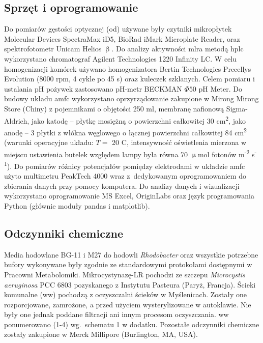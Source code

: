 \subsection{Sprzęt i oprogramowanie}\label{subsec:sprzet}
Do pomiarów gęstości optycznej (\acrshort{od}) używane były czytniki mikropłytek
Molecular Devices SpectraMax iD5, BioRad iMark
Microplate Reader, oraz spektrofotometr Unicam Helios $\upbeta$.
Do analizy aktywności \acrshort{mlra} metodą \acrshort{hplc} wykorzystano chromatograf
Agilent Technologies 1220 Infinity LC\@.
W celu homogenizacji komórek używano homogenizatora
Bertin Technologies Precellys Evolution (8000 rpm, 4 cykle po 45 s)
oraz kuleczek szklanych.
Celem pomiaru i ustalania pH pożywek zastosowano pH-metr
BECKMAN $\Phi 50$ pH Meter.
Do budowy układu \acrshort{amfc} wykorzystano oprzyrządowanie
zakupione w Mirong Mirong Store (Chiny) z pojemnikami
o objętości 250 ml, membranę nafionową Sigma-Aldrich,
jako katodę -- płytkę mosiężną o powierzchni całkowitej 30
cm\textsuperscript{2}, jako anodę -- 3 płytki z włókna węglowego
o łącznej powierzchni całkowitej 84 cm\textsuperscript{2}
(warunki operacyjne układu:
$T =$ 20 \degree C, intensywność oświetlenia mierzona w miejscu
ustawienia butelek względem lampy była równa
70 $\upmu$mol fotonów m\textsuperscript{-2} s\textsuperscript{-1}).
Do pomiarów różnicy potencjałów pomiędzy elektrodami
w układzie \acrshort{amfc} użyto multimetru PeakTech 4000 wraz
z~dedykowanym oprogramowaniem do zbierania danych przy pomocy komputera.
Do analizy danych i wizualizacji wykorzystano oprogramowanie
MS Excel, OriginLabs oraz język programowania Python
(głównie moduły pandas i matplotlib).

\subsection{Odczynniki chemiczne}\label{subsec:odczynniki}
Media hodowlane BG-11 i M27 do hodowli \textit{Rhodobacter} oraz
wszystkie potrzebne bufory wykonywane były zgodnie ze standardowymi
protokołami dostępnymi w Pracowni Metabolomiki.
Mikrocystynazę-LR pochodzi ze szczepu \textit{Microcystis aeruginosa} PCC 6803
pozyskanego z Instytutu Pasteura (Paryż, Francja).
Ścieki komunalne (\acrshort{ww}) pochodzą z oczyszczalni ścieków w Myślenicach.
Zostały one rozporcjowane, zamrożone, a przed użyciem wysterylizowane w autoklawie.
Nie były one jednak poddane filtracji ani innym procesom oczyszczania.
\acrshort{ww} ponumerowano (1-4) wg.\ schematu 1 w dodatku.
Pozostałe odczynniki chemiczne zostały zakupione
w Merck Millipore (Burlington, MA, USA).

